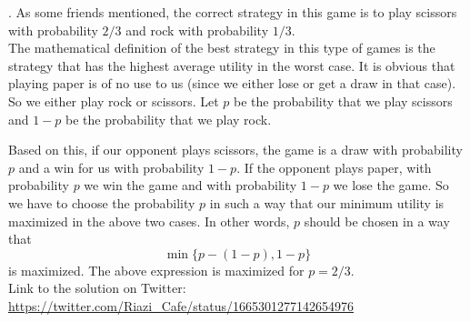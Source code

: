 \begin{solution}.
As some friends mentioned, the correct strategy in this game is to play scissors with probability $2/3$ and rock with probability $1/3$.\\[0.2cm]

The mathematical definition of the best strategy in this type of games is the strategy that has the highest average utility in the worst case. It is obvious that playing paper is of no use to us (since we either lose or get a draw in that case). So we either play rock or scissors. Let $p$ be the probability that we play scissors and $1-p$ be the probability that we play rock.

Based on this, if our opponent plays scissors, the game is a draw with probability $p$ and a win for us with probability $1-p$. If the opponent plays paper, with probability $p$ we win the game and with probability $1-p$ we lose the game. So we have to choose the probability $p$ in such a way that our minimum utility is maximized in the above two cases. In other words, $p$ should be chosen in  a way that
$$\min\{p-(1-p), 1-p\}$$
is maximized. The above expression is maximized for $p =  2/3$.\\[0.2cm]

Link to the solution on Twitter:  \url{https://twitter.com/Riazi_Cafe/status/1665301277142654976}\end{solution}